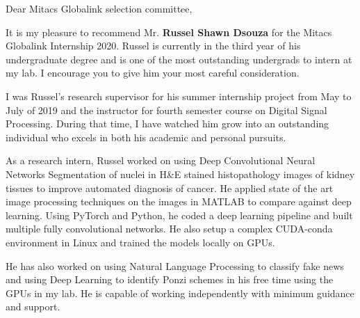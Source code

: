 \documentclass[12pt]{article}
\begin{document}
\noindent
Dear Mitacs Globalink selection committee,





\bigskip
\noindent
It is my pleasure to recommend Mr. \textbf{Russel Shawn Dsouza} for the Mitacs Globalink Internship 2020. Russel is currently in the third year of his undergraduate degree and is one of the most outstanding undergrads to intern at my lab. I encourage you to give him your most careful consideration. %

\medskip
\noindent
I was Russel's research supervisor for his summer internship project from May to July of 2019 and the instructor for fourth semester course on Digital Signal Processing.
During that time, I have watched him grow into an outstanding individual who excels in both his academic and personal pursuits. %

\medskip
\noindent
As a research intern, Russel worked on using Deep Convolutional Neural Networks Segmentation of nuclei in H\&E stained histopathology images of kidney tissues to improve automated diagnosis of cancer. He applied state of the art image processing techniques on the images in MATLAB to compare against deep learning.
Using PyTorch and Python, he coded a deep learning pipeline and built multiple fully convolutional networks. 
He also setup a complex CUDA-conda environment in Linux and trained the models locally on GPUs. %

\medskip
\noindent
He has also worked on using Natural Language Processing to classify fake news and using Deep Learning to identify Ponzi schemes in his free time using the GPUs in my lab.
He is capable of working independently with minimum guidance and support.
\end{document}
